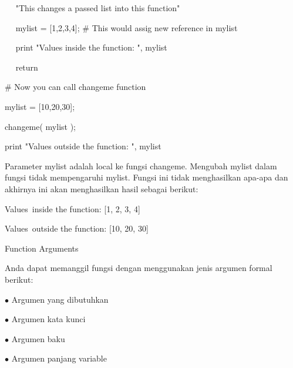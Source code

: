 \noindent 
 \hspace*{0.5in} ~~ "This changes a passed list into this function" \par
\noindent 
 \hspace*{0.5in} ~~ mylist = [1,2,3,4];  $  \#  $ This would assig new reference in mylist \par
\noindent 
 \hspace*{0.5in} ~~ print "Values inside the function: ", mylist \par
\noindent 
 \hspace*{0.5in} ~~ return \par
\vspace{12pt}
\noindent 
 \hspace*{0.5in}  $  \#  $ Now you can call changeme function \par
\noindent 
 \hspace*{0.5in} mylist = [10,20,30]; \par
\noindent 
 \hspace*{0.5in} changeme( mylist ); \par
\noindent 
 \hspace*{0.5in} print "Values outside the function: ", mylist \par
\noindent 
Parameter mylist adalah local ke fungsi changeme. Mengubah mylist dalam fungsi tidak mempengaruhi mylist. Fungsi ini tidak menghasilkan apa-apa dan akhirnya ini akan menghasilkan hasil sebagai berikut: \par
\noindent 
 \hspace*{0.5in} Values~inside the function:  [1, 2, 3, 4] \par
\noindent 
 \hspace*{0.5in} Values~outside the function:  [10, 20, 30] \par
\vspace{12pt}
\noindent 
Function Arguments \par
\noindent 
Anda dapat memanggil fungsi dengan menggunakan jenis argumen formal berikut: \par
\noindent 
 \hspace*{0.5in}  $ \bullet $ Argumen yang dibutuhkan \par
\noindent 
 \hspace*{0.5in}  $ \bullet $ Argumen kata kunci \par
\noindent 
 \hspace*{0.5in}  $ \bullet $ Argumen baku \par
\noindent 
 \hspace*{0.5in}  $ \bullet $ Argumen panjang variable \par
